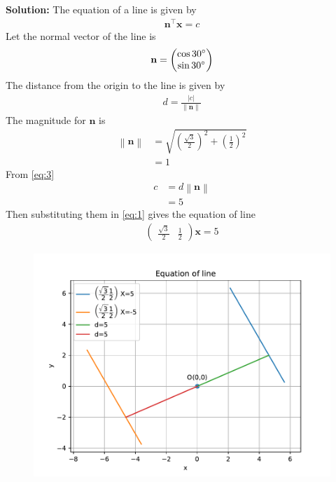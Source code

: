 \documentclass[12pt]{article}
\providecommand{\brak}[1]{\ensuremath{\left(#1\right)}}
\providecommand{\norm}[1]{\left\lVert#1\right\rVert}
\newcommand{\solution}{\noindent \textbf{Solution: }}
\newcommand{\myvec}[1]{\ensuremath{\begin{pmatrix}#1\end{pmatrix}}}
\providecommand{\abs}[1]{\left\vert#1\right\vert}
\let\vec\mathbf
\begin{document}
\begin{enumerate}
\solution The equation of a line is given by
		\begin{align}                                                                                          \vec{n}^\top\vec{x}=c \label{eq:1}                                                                                  \end{align}
Let the normal vector of the line is
\begin{align}
	\vec{n}=\myvec{\cos{30}\degree\\\sin{30}\degree}
\end{align}
The distance from the origin to the line is given by
\begin{align}
	d=\frac{\abs{c}}{\norm{\vec{n}}}\label{eq:3}
\end{align}
		The magnitude for $\vec{n}$ is 
	\begin{align}
		\norm{\vec{n}} &=\sqrt{\brak{{\frac{\sqrt{3}}{2}}}^2 + \brak{{\frac{1}{2}}}^2}\\
		       &=1
	\end{align}
		From \eqref{eq:3}
\begin{align}
	c&=d\norm{\vec{n}}\\
	&=5
\end{align}
		Then substituting them in \eqref{eq:1} gives the equation of line
\begin{align}
	\myvec{\frac{\sqrt{3}}{2}& \frac{1}{2}}\vec{x}=5
\end{align}
\begin{figure}[!h]
\begin{center}
\includegraphics[width=\columnwidth]{figs/fig.pdf}
\end{center}
\caption{}
\label{fig:Fig1}
\end{figure}
\end{enumerate}
\end{document}
